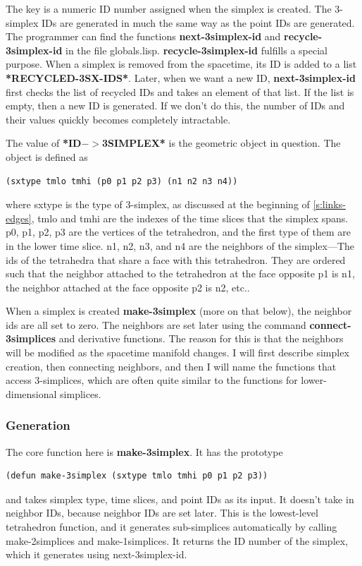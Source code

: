 \documentclass[12pt]{article}
\begin{document}
The key is a numeric ID number assigned when the simplex is
created. The 3-simplex IDs are generated in much the same way as the
point IDs are generated. The programmer can find the functions
\textbf{next-3simplex-id} and \textbf{recycle-3simplex-id} in the file
globals.lisp. \textbf{recycle-3simplex-id} fulfills a special
purpose. When a simplex is removed from the spacetime, its ID is added
to a list \textbf{*RECYCLED-3SX-IDS*}. Later, when we want a new ID,
\textbf{next-3simplex-id} first checks the list of recycled IDs and
takes an element of that list. If the list is empty, then a new ID is
generated. If we don't do this, the number of IDs and their values
quickly becomes completely intractable.

The value of \textbf{*ID$->$3SIMPLEX*} is the geometric object in
question. The object is defined as
\begin{lstlisting}
(sxtype tmlo tmhi (p0 p1 p2 p3) (n1 n2 n3 n4))
\end{lstlisting}
where sxtype is the type of 3-simplex, as discussed at the beginning
of \ref{s:links-edges}, tmlo and tmhi are the indexes of the
time slices that the simplex spans. p0, p1, p2, p3 are the vertices of
the tetrahedron, and the first type of them are in the lower time
slice. n1, n2, n3, and n4 are the neighbors of the simplex---The ids
of the tetrahedra that share a face with this tetrahedron. They are
ordered such that the neighbor attached to the tetrahedron at the face
opposite p1 is n1, the neighbor attached at the face opposite p2 is
n2, etc..

When a simplex is created \textbf{make-3simplex} (more on that below),
the neighbor ids are all set to zero. The neighbors are set later
using the command \textbf{connect-3simplices} and derivative
functions. The reason for this is that the neighbors will be modified
as the spacetime manifold changes. I will first describe simplex
creation, then connecting neighbors, and then I will name the
functions that access 3-simplices, which are often quite similar to
the functions for lower-dimensional simplices.

\subsubsection{Generation}
The core function here is \textbf{make-3simplex}. It has the prototype 
\begin{lstlisting}
(defun make-3simplex (sxtype tmlo tmhi p0 p1 p2 p3))
\end{lstlisting}
and takes simplex type, time slices, and point IDs as its input. It
doesn't take in neighbor IDs, because neighbor IDs are set later. This
is the lowest-level tetrahedron function, and it generates
sub-simplices automatically by calling make-2simplices and
make-1simplices. It returns the ID number of the simplex, which it
generates using next-3simplex-id. 
\end{document}
